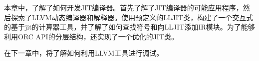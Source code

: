 本章中，了解了如何开发JIT编译器。首先了解了JIT编译器的可能应用程序，然后探索了LLVM动态编译器和解释器。使用预定义的LLJIT类，构建了一个交互式的基于jit的计算器工具，并了解了如何查找符号和向LLJIT添加IR模块。为了能够利用ORC API的分层结构，还实现了一个优化的JIT类。

在下一章中，将了解如何利用LLVM工具进行调试。